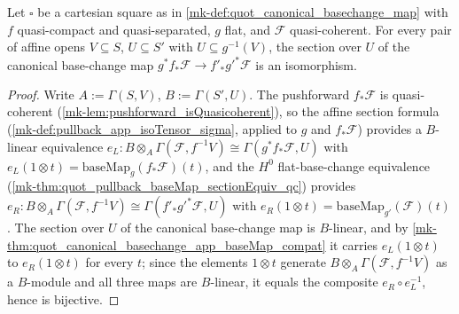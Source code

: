\begin{theorem}
  \label{mk-thm:quot_canonical_basechange_app_app_isIso_of_le_preimage}
  \leanok

  Let \(\square\) be a cartesian square as in
  \ref{mk-def:quot_canonical_basechange_map} with \(f\) quasi-compact and
  quasi-separated, \(g\) flat, and \(\mathcal F\) quasi-coherent. For every
  pair of affine opens \(V \subseteq S\), \(U \subseteq S'\) with
  \(U \subseteq g^{-1}(V)\), the section over \(U\) of the canonical
  base-change map \(g^* f_* \mathcal F \to f'_* g'^* \mathcal F\) is an
  isomorphism.
\end{theorem}
\begin{proof}
  \leanok{}
  Write \(A := \Gamma(S, V)\), \(B := \Gamma(S', U)\). The pushforward
  \(f_* \mathcal F\) is quasi-coherent
  (\ref{mk-lem:pushforward_isQuasicoherent}), so the affine section formula
  (\ref{mk-def:pullback_app_isoTensor_sigma}, applied to \(g\) and
  \(f_*\mathcal F\)) provides a \(B\)-linear equivalence
  \(e_L : B \otimes_A \Gamma(\mathcal F, f^{-1}V) \cong
    \Gamma(g^* f_* \mathcal F, U)\) with
  \(e_L(1 \otimes t) = \mathrm{baseMap}_{g}(f_*\mathcal F)(t)\), and the
  \(H^0\) flat-base-change equivalence
  (\ref{mk-thm:quot_pullback_baseMap_sectionEquiv_qc}) provides
  \(e_R : B \otimes_A \Gamma(\mathcal F, f^{-1}V) \cong
    \Gamma(f'_* g'^* \mathcal F, U)\) with
  \(e_R(1 \otimes t) = \mathrm{baseMap}_{g'}(\mathcal F)(t)\).
  The section over \(U\) of the canonical base-change map is
  \(B\)-linear, and by
  \ref{mk-thm:quot_canonical_basechange_app_baseMap_compat} it carries
  \(e_L(1 \otimes t)\) to \(e_R(1 \otimes t)\) for every \(t\); since the
  elements \(1 \otimes t\) generate
  \(B \otimes_A \Gamma(\mathcal F, f^{-1}V)\) as a \(B\)-module and all
  three maps are \(B\)-linear, it equals the composite
  \(e_R \circ e_L^{-1}\), hence is bijective.
\end{proof}


